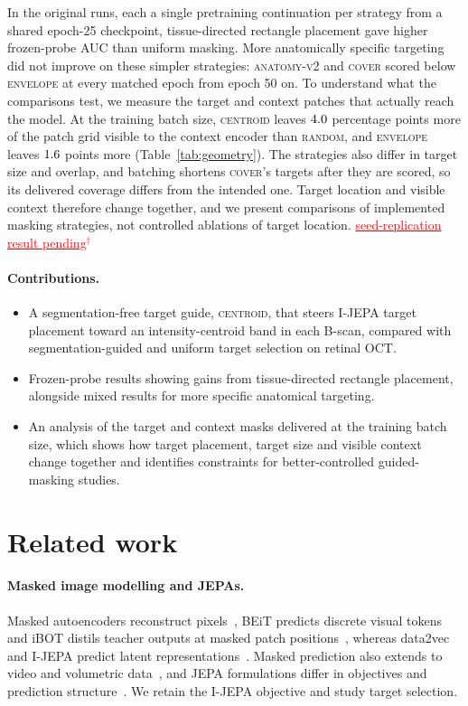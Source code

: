 \documentclass{article}
\newcommand{\ph}[1]{\textcolor{red}{\underline{#1}$^{\dagger}$}}
\newcommand{\CRSeedResultsPending}{\ph{seed-replication result pending}}
\newcommand{\ArmBest}{\textsc{centroid}}
\begin{document}
In the original runs, each a single pretraining continuation per strategy
from a shared epoch-25 checkpoint, tissue-directed rectangle placement gave
higher frozen-probe AUC than uniform masking. More anatomically specific
targeting did not improve on these simpler strategies: \textsc{anatomy-v2} and
\textsc{cover} scored below \textsc{envelope} at every matched epoch from
epoch 50 on. To understand what the
comparisons test, we measure the target and context patches that actually
reach the model. At the training batch size, \ArmBest{} leaves
$4.0$ percentage points more of the patch grid visible to the
context encoder than \textsc{random}, and \textsc{envelope} leaves
$1.6$ points more (Table~\ref{tab:geometry}). The strategies also
differ in target size and overlap, and batching shortens \textsc{cover}'s
targets after they are scored, so its delivered coverage differs from the
intended one. Target location and visible context therefore change
together, and we present comparisons of implemented masking strategies, not
controlled ablations of target location. \CRSeedResultsPending

\paragraph{Contributions.}
\begin{itemize}
\setlength{\itemsep}{0pt}\setlength{\parskip}{0pt}
\item A segmentation-free target guide, \ArmBest{}, that steers I-JEPA target
      placement toward an intensity-centroid band in each B-scan, compared with
      segmentation-guided and uniform target selection on retinal OCT.
\item Frozen-probe results showing gains from tissue-directed rectangle
      placement, alongside mixed results for more specific anatomical targeting.
\item An analysis of the target and context masks delivered at the training
      batch size, which shows how target placement, target size and visible
      context change together and identifies constraints for better-controlled
      guided-masking studies.
\end{itemize}

\section{Related work}

\paragraph{Masked image modelling and JEPAs.}
Masked autoencoders reconstruct pixels~\citep{he2022mae,xie2022simmim},
BEiT predicts discrete visual tokens~\citep{bao2022beit} and iBOT distils
teacher outputs at masked patch positions~\citep{zhou2022ibot}, whereas
data2vec and I-JEPA predict latent
representations~\citep{baevski2022data2vec,assran2023ijepa}. Masked prediction
also extends to video and volumetric
data~\citep{bardes2024vjepa,chen2023mim3d,taleb20203dssl}, and JEPA formulations
differ in objectives and prediction
structure~\citep{balestriero2025lejepa,he2025dseqjepa}. We retain the I-JEPA
objective and study target selection.
\end{document}
